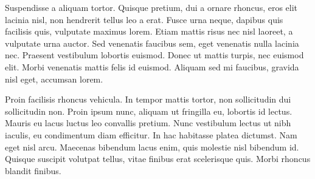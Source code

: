 \documentclass[class=memoir,crop=false]{standalone}
\begin{document}
Suspendisse a aliquam tortor. Quisque pretium, dui a ornare rhoncus, eros elit lacinia nisl, non hendrerit tellus leo a erat. Fusce urna neque, dapibus quis facilisis quis, vulputate maximus lorem. Etiam mattis risus nec nisl laoreet, a vulputate urna auctor. Sed venenatis faucibus sem, eget venenatis nulla lacinia nec. Praesent vestibulum lobortis euismod. Donec ut mattis turpis, nec euismod elit. Morbi venenatis mattis felis id euismod. Aliquam sed mi faucibus, gravida nisl eget, accumsan lorem.

Proin facilisis rhoncus vehicula. In tempor mattis tortor, non sollicitudin dui sollicitudin non. Proin ipsum nunc, aliquam ut fringilla eu, lobortis id lectus. Mauris eu lacus luctus leo convallis pretium. Nunc vestibulum lectus ut nibh iaculis, eu condimentum diam efficitur. In hac habitasse platea dictumst. Nam eget nisl arcu. Maecenas bibendum lacus enim, quis molestie nisl bibendum id. Quisque suscipit volutpat tellus, vitae finibus erat scelerisque quis. Morbi rhoncus blandit finibus. 

\ifstandalone\fi
\end{document}

